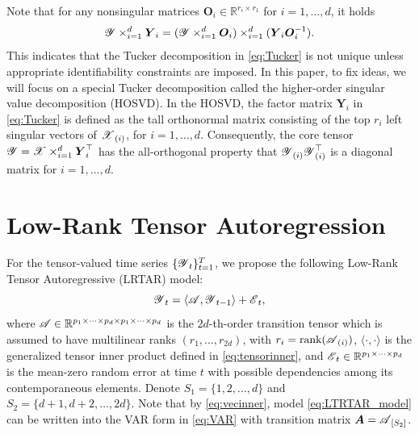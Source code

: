\documentclass[12pt]{article}
\newcommand{\bm}{\boldsymbol}
\newcommand{\cm}[1]{\mbox{\boldmath$\mathscr{#1}$}}
\begin{document}
Note that for any nonsingular matrices $\bm{O}_i\in\mathbb{R}^{r_i\times r_1}$ for $i=1, \dots, d$, it holds \[\cm{Y}\times_{i=1}^d\bm{Y}_i=(\cm{Y}\times_{i=1}^d\bm{O}_i) \times_{i=1}^d (\bm{Y}_i\bm{O}_i^{-1}).\]
This indicates that the Tucker decomposition in \eqref{eq:Tucker} is not unique unless appropriate identifiability constraints are imposed.  
In this paper, to fix ideas, we will focus on  a special Tucker decomposition called the higher-order singular value decomposition (HOSVD). In the HOSVD, the factor matrix $\bm{Y}_i$ in \eqref{eq:Tucker} is defined as the tall orthonormal matrix consisting of the top $r_i$ left singular vectors of $\cm{X}_{(i)}$, for $i=1, \dots, d$. Consequently, the core tensor $\cm{Y}=\cm{X}\times_{i=1}^d\bm{Y}_i^\top$ has the all-orthogonal property that $\cm{Y}_{(i)}\cm{Y}_{(i)}^\top$ is a diagonal matrix for $i=1,\dots, d$. 



\section{Low-Rank Tensor Autoregression\label{sec:LRTAR}}
For the tensor-valued time series $\{\cm{Y}_t\}_{t=1}^T$, we propose the following Low-Rank Tensor Autoregressive (LRTAR) model:
\begin{equation}
\label{eq:LTRTAR_model}
\cm{Y}_t=\langle\cm{A},\cm{Y}_{t-1}\rangle+\cm{E}_t,
\end{equation}
where $\cm{A}\in\mathbb{R}^{p_1\times\cdots\times p_d\times p_1\times\cdots\times p_d}$ is the $2d$-th-order transition tensor which is assumed to have multilinear ranks $(r_1, \dots, r_{2d})$, with  $r_i=\text{rank}(\cm{A}_{(i)})$, $\langle\cdot,\cdot\rangle$ is the generalized tensor inner product defined in \eqref{eq:tensorinner},  and  $\cm{E}_t \in\mathbb{R}^{p_1\times\cdots\times p_d}$ is the mean-zero random error at time $t$ with possible dependencies among its contemporaneous elements. Denote $S_1=\{1,2,\dots,d\}$ and $S_2=\{d+1,d+2,\dots,2d\}$. Note that by \eqref{eq:vecinner}, model \eqref{eq:LTRTAR_model} can be written into the VAR form in \eqref{eq:VAR} with transition matrix $\bm{A}=\cm{A}_{[S_2]}$. 
\end{document}
